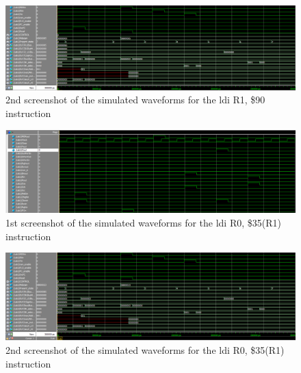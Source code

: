 \documentclass{article}
\begin{document}
        \begin{figure}[h!]
            \begin{center}
                \includegraphics[width=15cm]{ldi_case_3_wave_bottom_half.png}
                \caption{2nd screenshot of the simulated waveforms for the ldi  R1, \$90 instruction}
            \end{center}
        \end{figure}

        \begin{figure}[h!]
            \begin{center}
                \includegraphics[width=15cm]{ldi_case_4_wave_top_half.png}
                \caption{1st screenshot of the simulated waveforms for the  ldi R0, \$35(R1) instruction}
            \end{center}
        \end{figure}
        
        \begin{figure}[h!]
            \begin{center}
                \includegraphics[width=15cm]{ldi_case_4_wave_bottom_half.png}
                \caption{2nd screenshot of the simulated waveforms for the ldi R0, \$35(R1) instruction}
            \end{center}
        \end{figure}
        
\end{document}

